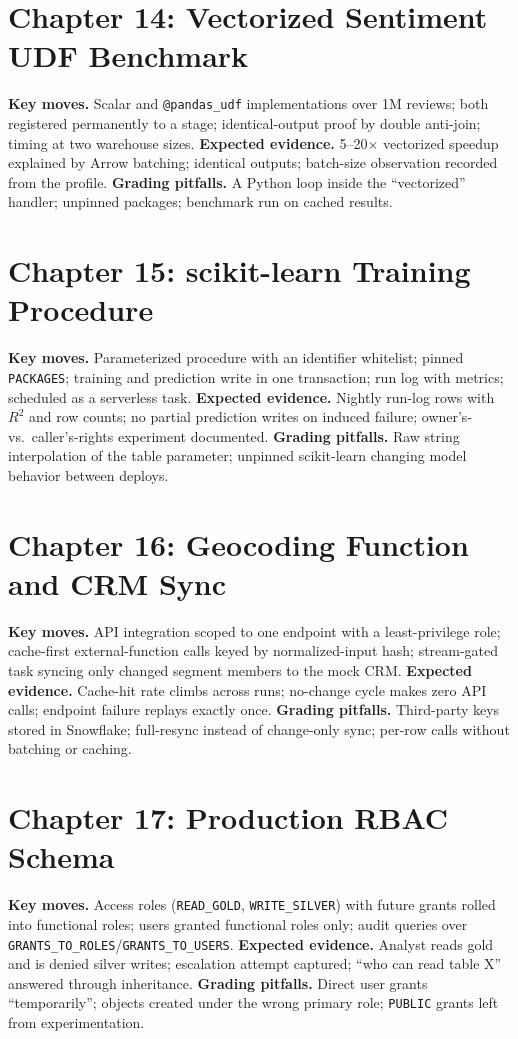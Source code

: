 \section{Chapter 14: Vectorized Sentiment UDF Benchmark}
\textbf{Key moves.} Scalar and \texttt{@pandas\_udf} implementations over 1M reviews; both registered permanently to a stage; identical-output proof by double anti-join; timing at two warehouse sizes.
\textbf{Expected evidence.} 5--20$\times$ vectorized speedup explained by Arrow batching; identical outputs; batch-size observation recorded from the profile.
\textbf{Grading pitfalls.} A Python loop inside the ``vectorized'' handler; unpinned packages; benchmark run on cached results.

\section{Chapter 15: scikit-learn Training Procedure}
\textbf{Key moves.} Parameterized procedure with an identifier whitelist; pinned \texttt{PACKAGES}; training and prediction write in one transaction; run log with metrics; scheduled as a serverless task.
\textbf{Expected evidence.} Nightly run-log rows with $R^2$ and row counts; no partial prediction writes on induced failure; owner's- vs.\ caller's-rights experiment documented.
\textbf{Grading pitfalls.} Raw string interpolation of the table parameter; unpinned scikit-learn changing model behavior between deploys.

\section{Chapter 16: Geocoding Function and CRM Sync}
\textbf{Key moves.} API integration scoped to one endpoint with a least-privilege role; cache-first external-function calls keyed by normalized-input hash; stream-gated task syncing only changed segment members to the mock CRM.
\textbf{Expected evidence.} Cache-hit rate climbs across runs; no-change cycle makes zero API calls; endpoint failure replays exactly once.
\textbf{Grading pitfalls.} Third-party keys stored in Snowflake; full-resync instead of change-only sync; per-row calls without batching or caching.

\section{Chapter 17: Production RBAC Schema}
\textbf{Key moves.} Access roles (\texttt{READ\_GOLD}, \texttt{WRITE\_SILVER}) with future grants rolled into functional roles; users granted functional roles only; audit queries over \texttt{GRANTS\_TO\_ROLES}/\texttt{GRANTS\_TO\_USERS}.
\textbf{Expected evidence.} Analyst reads gold and is denied silver writes; escalation attempt captured; ``who can read table X'' answered through inheritance.
\textbf{Grading pitfalls.} Direct user grants ``temporarily''; objects created under the wrong primary role; \texttt{PUBLIC} grants left from experimentation.


